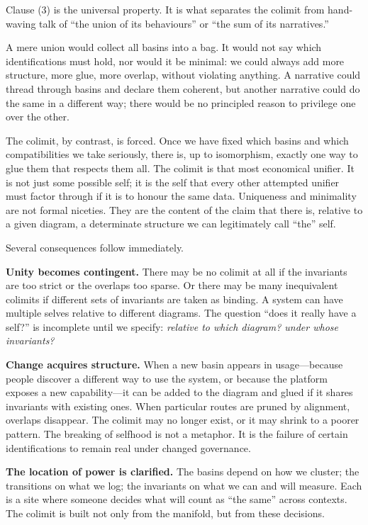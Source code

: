 \documentclass[12pt,a4paper]{article}
\begin{document}
Clause (3) is the universal property. It is what separates the colimit from hand-waving talk of ``the union of its behaviours'' or ``the sum of its narratives.''

A mere union would collect all basins into a bag. It would not say which identifications must hold, nor would it be minimal: we could always add more structure, more glue, more overlap, without violating anything. A narrative could thread through basins and declare them coherent, but another narrative could do the same in a different way; there would be no principled reason to privilege one over the other.

The colimit, by contrast, is forced. Once we have fixed which basins and which compatibilities we take seriously, there is, up to isomorphism, exactly one way to glue them that respects them all. The colimit is that most economical unifier. It is not just some possible self; it is the self that every other attempted unifier must factor through if it is to honour the same data. Uniqueness and minimality are not formal niceties. They are the content of the claim that there is, relative to a given diagram, a determinate structure we can legitimately call ``the'' self.

Several consequences follow immediately.

\textbf{Unity becomes contingent.} There may be no colimit at all if the invariants are too strict or the overlaps too sparse. Or there may be many inequivalent colimits if different sets of invariants are taken as binding. A system can have multiple selves relative to different diagrams. The question ``does it really have a self?'' is incomplete until we specify: \emph{relative to which diagram? under whose invariants?}

\textbf{Change acquires structure.} When a new basin appears in usage---because people discover a different way to use the system, or because the platform exposes a new capability---it can be added to the diagram and glued if it shares invariants with existing ones. When particular routes are pruned by alignment, overlaps disappear. The colimit may no longer exist, or it may shrink to a poorer pattern. The breaking of selfhood is not a metaphor. It is the failure of certain identifications to remain real under changed governance.

\textbf{The location of power is clarified.} The basins depend on how we cluster; the transitions on what we log; the invariants on what we can and will measure. Each is a site where someone decides what will count as ``the same'' across contexts. The colimit is built not only from the manifold, but from these decisions.
\end{document}
